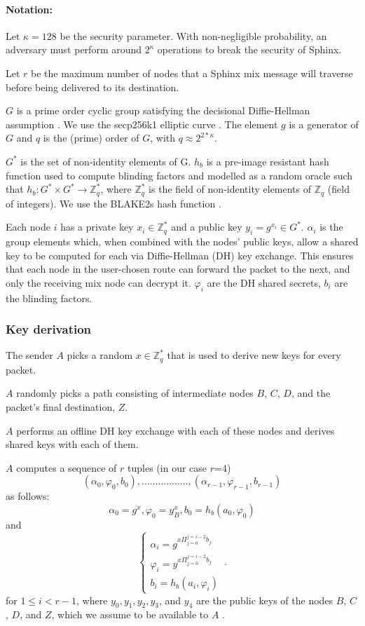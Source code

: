 \paragraph{Notation:}Let $\kappa=128$ be the security parameter. With non-negligible probability, an adversary must perform around $2^\kappa$ operations to break the security of Sphinx.

Let $r$ be the maximum number of nodes that a Sphinx mix message will traverse before being delivered to its destination.

$G$ is a prime order cyclic group satisfying the decisional Diffie-Hellman assumption \cite{Boneh_1998}. We use the secp256k1 elliptic curve \cite{sec2}. The element $g$ is a generator of $G$ and $q$ is the (prime) order of $G$, with $q\approx2^{2*\kappa}$.

$G^*$ is the set of non-identity elements of G. $h_b$ is a pre-image resistant hash function used to compute blinding factors and modelled as a random oracle such that
$h_b:G^*\times G^*\rightarrow\mathbb{Z}^*_q$, where $\mathbb{Z}^*_q$ is the field of non-identity elements of $\mathbb{Z}_q$ (field of integers). We use the BLAKE2s hash function \cite{blake2}.

Each node $i$ has a private key $x_{i}\in \mathbb{Z}^*_q$ and a public key $y_{i}=g^{x_{i}}\in G^*$.
$\alpha_i$ is the group elements which, when combined with the nodes’ public keys, allow a shared key to be computed for each via Diffie-Hellman (DH) key exchange. This ensures that each node in the user-chosen route can forward the packet to the next, and only the receiving mix node can decrypt it.
$\varphi_i$ are the DH shared secrets, $b_i$ are the blinding factors.

\subsubsection{Key derivation}
\label{sec:sphinx:keyderivation}
The sender $A$ picks a random $x\in \mathbb{Z}^*_q$ that is used to derive new keys for every packet.

$A$ randomly picks a path consisting of intermediate nodes $B$, $C$, $D$, and the packet's final destination, $Z$.

$A$ performs an offline DH key exchange with each of these nodes and derives shared keys with each of them.

$A$ computes a sequence of $r$ tuples (in our case $r$=4)  $$(\alpha_0,\varphi_0,b_0),.................,(\alpha_{r-1},\varphi_{r-1},b_{r-1})$$ as follows:
$$\alpha_0=g^x,\varphi_0=y^x_B,b_0=h_b(a_0,\varphi_0)$$
and
\begin{equation}
    \begin{cases}
        \alpha_i=g^{x\Pi_{j=0}^{j=i-2}b_j}\\
        \varphi_i=y^{x\Pi_{j=0}^{j=i-2}b_j} \\
        b_i=h_b(a_i,\varphi_i)
    \end{cases}\,.
    \label{eq:1}
\end{equation}
for $1\le i < r-1$, where $y_0,y_1, y_2, y_3$, and $y_4$ are the public keys of the nodes $B$, $C$, $D$, and $Z$, which we assume to be available to $A$ .

